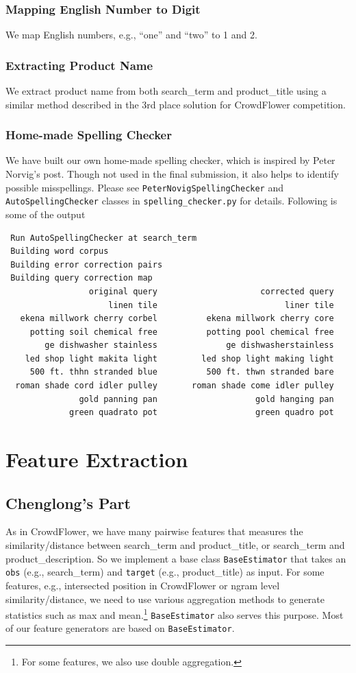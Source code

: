 \documentclass[12pt]{article}
\begin{document}
\subsubsection{Mapping English Number to Digit}
We map English numbers, e.g., ``one'' and ``two'' to 1 and 2.

\subsubsection{Extracting Product Name}
We extract product name from both search\_term and product\_title using a similar method described in the 3rd place solution for CrowdFlower competition\cite{crowdflower_3place}.

\subsubsection{Home-made Spelling Checker}
We have built our own home-made spelling checker, which is inspired by Peter Norvig's post\cite{PeterNorvig}. Though not used in the final submission, it also helps to identify possible misspellings. Please see \texttt{PeterNovigSpellingChecker} and \texttt{AutoSpellingChecker} classes in \texttt{spelling\_checker.py} for details. Following is some of the output
\begin{verbatim}
 Run AutoSpellingChecker at search_term
 Building word corpus
 Building error correction pairs
 Building query correction map
                 original query 	                corrected query
                     linen tile 	                     liner tile
   ekena millwork cherry corbel 	     ekena millwork cherry core
     potting soil chemical free 	     potting pool chemical free
        ge dishwasher stainless 	         ge dishwasherstainless
    led shop light makita light 	    led shop light making light
     500 ft. thhn stranded blue 	     500 ft. thwn stranded bare
  roman shade cord idler pulley 	  roman shade come idler pulley
               gold panning pan 	               gold hanging pan
             green quadrato pot 	               green quadro pot
\end{verbatim}

\section{Feature Extraction}
\subsection{Chenglong's Part}
\label{subsec:FeatureExtraction_Chenglong}
As in CrowdFlower, we have many pairwise features that measures the similarity/distance between search\_term and product\_title, or search\_term and product\_description. So we implement a base class \texttt{BaseEstimator} that takes an \texttt{obs} (e.g., search\_term) and \texttt{target} (e.g., product\_title) as input. For some features, e.g., intersected position in CrowdFlower or ngram level similarity/distance, we need to use various aggregation methods to generate statistics such as max and mean.\footnote{For some features, we also use double aggregation.} \texttt{BaseEstimator} also serves this purpose. Most of our feature generators are based on \texttt{BaseEstimator}.
\end{document}
